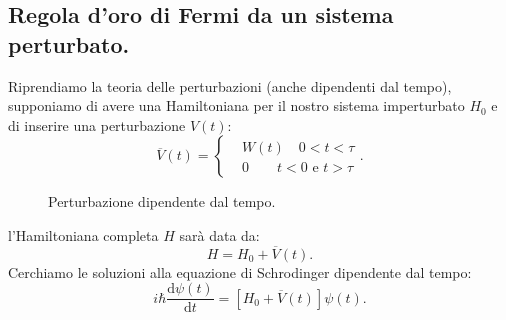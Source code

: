 \subsection{Regola d'oro di Fermi da un sistema perturbato.}%
Riprendiamo la teoria delle perturbazioni (anche dipendenti dal tempo), supponiamo di avere una Hamiltoniana per il nostro sistema imperturbato $H_0$ e di inserire una perturbazione $V(t)$:
\[
    \overline{V}(t) = \begin{cases}
	&W(t)  \quad  0<t<\tau\\
	&0 	\quad \quad t<0 \text{ e } t>\tau
    \end{cases}
.\] 
\begin{figure}[H]
    \centering
    \caption{Perturbazione dipendente dal tempo.}
    \label{fig:perturbazione-a-gradino}
\end{figure}
\noindent
l'Hamiltoniana completa $H$ sarà data da:
\[
	H=H_0+\overline{V}(t)
.\] 
Cerchiamo le soluzioni alla equazione di Schrodinger dipendente dal tempo:
\[
    i\hbar \frac{\text{d} \psi(t)}{\text{d} t} 
    = \left[H_0+\overline{V}(t) \right]\psi (t) 
.\] 
